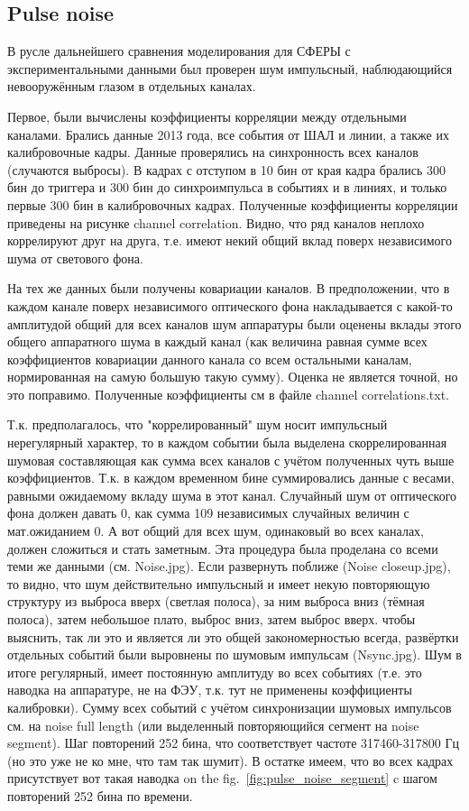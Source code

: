 \documentclass[final,5p,times,twocolumn]{elsarticle}
\begin{document}
\subsection{Pulse noise}
\label{sect:noiseremoval}

{\Russian

В русле дальнейшего сравнения моделирования для СФЕРЫ с экспериментальными данными был проверен шум импульсный, наблюдающийся невооружённым глазом в отдельных каналах.

Первое, были вычислены коэффициенты корреляции между отдельными каналами. Брались данные 2013 года, все события от ШАЛ и линии, а также их калибровочные кадры. Данные проверялись на синхронность всех каналов (случаются выбросы). В кадрах с отступом в 10 бин от края кадра брались 300 бин до триггера и 300 бин до синхроимпульса в событиях и в линиях, и только первые 300 бин в калибровочных кадрах. Полученные коэффициенты корреляции приведены на рисунке channel correlation. Видно, что ряд каналов неплохо коррелируют друг на друга, т.е. имеют некий общий вклад поверх независимого шума от светового фона.

На тех же данных были получены ковариации каналов. В предположении, что в каждом канале поверх независимого оптического фона накладывается с какой-то амплитудой общий для всех каналов шум аппаратуры были оценены вклады этого общего аппаратного шума в каждый канал (как величина равная сумме всех коэффициентов ковариации данного канала со всем остальными каналам, нормированная на самую большую такую сумму). Оценка не является точной, но это поправимо. Полученные коэффициенты см в файле channel correlations.txt.

Т.к. предполагалось, что "коррелированный" шум носит импульсный нерегулярный характер, то в каждом событии была выделена скоррелированная шумовая составляющая как сумма всех каналов с учётом полученных чуть выше коэффициентов. Т.к. в каждом временном бине суммировались данные с весами, равными ожидаемому вкладу шума в этот канал. Случайный шум от оптического фона должен давать 0, как сумма 109 независимых случайных величин с мат.ожиданием 0. А вот общий для всех шум, одинаковый во всех каналах, должен сложиться и стать заметным.
Эта процедура была проделана со всеми теми же данными (см. Noise.jpg). Если развернуть поближе (Noise  closeup.jpg), то видно, что шум действительно импульсный и имеет некую повторяющую структуру из выброса вверх (светлая полоса), за ним выброса вниз (тёмная полоса), затем небольшое плато, выброс вниз, затем выброс вверх. чтобы выяснить, так ли это и является ли это общей закономерностью всегда, развёртки отдельных событий были выровнены по шумовым импульсам (Nsync.jpg). Шум в итоге регулярный, имеет постоянную амплитуду во всех событиях (т.е. это наводка на аппаратуре, не на ФЭУ, т.к. тут не применены коэффициенты калибровки).
Сумму всех событий с учётом синхронизации шумовых импульсов см. на noise full length (или выделенный повторяющийся сегмент на noise segment). Шаг повторений 252 бина, что соответствует частоте 317460-317800 Гц (но это уже не ко мне, что там так шумит). В остатке имеем, что во всех кадрах присутствует вот такая наводка on the fig.~\ref{fig:pulse_noise_segment}  c шагом повторений 252 бина по времени.

}
\end{document}
